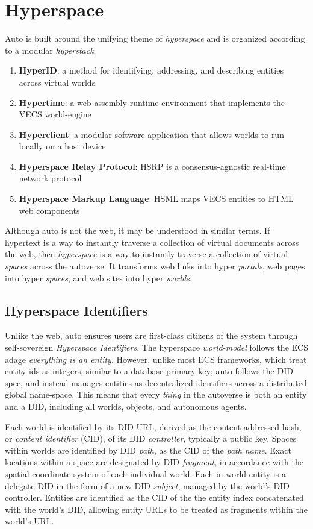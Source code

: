 \documentclass[twocolumn, 10pt]{article}
\begin{document}
\section{Hyperspace}

Auto is built around the unifying theme of \textit{hyperspace} and is organized according to a modular \textit{hyperstack}.  
\begin{enumerate}
    \item \textbf{HyperID}: a method for identifying, addressing, and describing entities across virtual worlds
    \item \textbf{Hypertime}: a web assembly runtime environment that implements the VECS world-engine
    \item \textbf{Hyperclient}: a modular software application that allows worlds to run locally on a host device
    \item \textbf{Hyperspace Relay Protocol}: HSRP is a consensus-agnostic real-time network protocol
    \item     \textbf{Hyperspace Markup Language}: HSML maps VECS entities to HTML web components
\end{enumerate} 
Although auto is not the web, it may be understood in similar terms. If hypertext is a way to instantly traverse a collection of virtual documents across the web, then \textit{hyperspace} is a way to instantly traverse a collection of virtual \textit{spaces} across the autoverse. It transforms web links into hyper \textit{portals}, web pages into hyper\textit{ spaces}, and web sites into hyper \textit{worlds}.

\subsection{Hyperspace Identifiers}

 Unlike the web, auto ensures users are first-class citizens of the system through self-sovereign \textit{Hyperspace Identifiers}. The hyperspace \textit{world-model} follows the ECS adage \textit{everything is an entity}. However, unlike most ECS frameworks, which treat entity ids as integers, similar to a database primary key; auto follows the DID spec, and instead manages entities as decentralized identifiers across a distributed global name-space. This means that every \textit{thing} in the autoverse is both an entity and a DID, including all worlds, objects, and autonomous agents.

Each world is identified by its DID URL, derived as the content-addressed hash, or \textit{content identifier} (CID), of its DID \textit{controller}, typically a public key. Spaces within worlds are identified by DID \textit{path}, as the CID of the \textit{path name}. Exact locations within a space are designated by DID \textit{fragment}, in accordance with the spatial coordinate system of each individual world. Each in-world entity is a delegate DID in the form of a new DID \textit{subject}, managed by the world’s DID controller. Entities are identified as the CID of the the entity index concatenated with the world’s DID, allowing entity URLs to be treated as fragments within the world's URL. 
\end{document}
